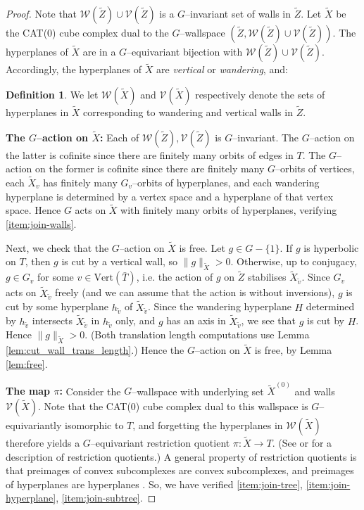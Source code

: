 \documentclass[11pt,oneside]{amsart}
\newcounter{ax}
\theoremstyle{definition}
\newtheorem{defn}[thm]{Definition}
\newcommand{\vertices}{\mathrm{Vert}}
\begin{document}
\begin{proof}
Note that $\mathcal W(\widetilde Z)\cup\mathcal V(\widetilde Z)$ is a $G$--invariant set of walls in $\widetilde Z$.  Let $\widetilde X$ be the CAT(0) cube complex dual to the $G$--wallspace $(\widetilde Z, \mathcal W(\widetilde Z)\cup\mathcal V(\widetilde Z))$.  The hyperplanes of $\widetilde X$ are in a $G$--equivariant bijection with $\mathcal W(\widetilde Z)\cup\mathcal V(\widetilde Z)$.  Accordingly, the hyperplanes of $\widetilde X$ are \emph{vertical} or \emph{wandering}, and: 

\begin{defn}\label{defn:vertical-wandering-in-X}
We let $\mathcal W(\widetilde X)$ and $\mathcal V(\widetilde X)$ respectively denote the sets of hyperplanes in $\widetilde X$ corresponding to wandering and vertical walls in $\widetilde Z$.
\end{defn}

\textbf{The $G$--action on $\widetilde X$:} Each of $\mathcal W(\widetilde Z),\mathcal V(\widetilde Z)$ is $G$--invariant.  The $G$--action on the latter is cofinite since there are finitely many orbits of edges in $T$.  The $G$--action on the former is cofinite since there are finitely many $G$--orbits of vertices, each $\widetilde X_v$ has finitely many $G_v$--orbits of hyperplanes, and each wandering hyperplane is determined by a vertex space and a hyperplane of that vertex space.  Hence $G$ acts on $\widetilde X$ with finitely many orbits of hyperplanes, verifying \eqref{item:join-walls}.

Next, we check that the $G$--action on $\widetilde X$ is free.  Let $g\in G-\{1\}$.  If $g$ is hyperbolic on $T$, then $g$ is cut by a vertical wall, so $\|g\|_{\widetilde X}>0$.  Otherwise, up to conjugacy, $g\in G_v$ for some $v\in\vertices(\bar T)$, i.e. the action of $g$ on $\widetilde Z$ stabilises $\widetilde X_{\tilde v}$.  Since  $G_v$ acts on $\widetilde X_{\tilde v}$ freely (and we can assume that the action is without inversions), $g$ is cut by some hyperplane $h_{\tilde v}$ of $\widetilde X_{\tilde v}$.  Since the wandering hyperplane $H$ determined by $h_{\tilde v}$ intersects $\widetilde X_{\tilde v}$ in $h_{\tilde v}$ only, and $g$ has an axis in $\widetilde X_{\tilde v}$, we see that $g$ is cut by $H$.  Hence $\|g\|_{\widetilde X}>0$.  (Both translation length computations use Lemma \ref{lem:cut_wall_trans_length}.)  Hence the $G$--action on $\widetilde X$ is free, by Lemma \ref{lem:free}.

\textbf{The map $\pi$:}  Consider the $G$--wallspace with underlying set $\widetilde X^{(0)}$ and walls $\mathcal V(\widetilde X)$.  Note that the CAT(0) cube complex dual to this wallspace is $G$--equivariantly isomorphic to $T$, and forgetting the hyperplanes in $\mathcal W(\widetilde X)$ therefore yields a $G$--equivariant restriction quotient $\pi:\widetilde X\to T$.  (See \cite[Sec. 2]{CapraceSageev:rank} or \cite{HuangKleiner} for a description of restriction quotients.)  A general property of restriction quotients is that preimages of convex subcomplexes are convex subcomplexes, and preimages of hyperplanes are hyperplanes \cite[Sec. 4]{HuangKleiner}.  So, we have verified \eqref{item:join-tree}, \eqref{item:join-hyperplane}, \eqref{item:join-subtree}.


\end{proof}
\end{document}
